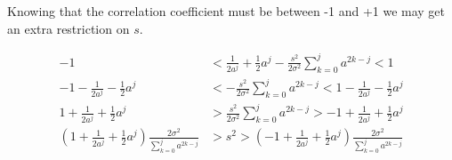 \begin{itemize}
    Knowing that the correlation coefficient must be between -1 and +1 we may get an extra restriction on $s$.

    \begin{align*}
        -1 &< \frac{1}{2a^j} + \frac{1}{2}a^j - \frac{s^2}{2\sigma^2}\sum_{k=0}^{j}a^{2k-j} < 1 \\
        -1 - \frac{1}{2a^j} - \frac{1}{2}a^j &<  - \frac{s^2}{2\sigma^2}\sum_{k=0}^{j}a^{2k-j} < 1 - \frac{1}{2a^j} - \frac{1}{2}a^j \\
        1 + \frac{1}{2a^j} + \frac{1}{2}a^j &>  \frac{s^2}{2\sigma^2}\sum_{k=0}^{j}a^{2k-j} > -1 + \frac{1}{2a^j} + \frac{1}{2}a^j \\
        \left(1 + \frac{1}{2a^j} + \frac{1}{2}a^j\right)\frac{2\sigma^2}{\sum_{k=0}^{j}a^{2k-j}} &>  s^2 > \left(-1 + \frac{1}{2a^j} + \frac{1}{2}a^j\right)\frac{2\sigma^2}{\sum_{k=0}^{j}a^{2k-j}} \\
    \end{align*}

\end{itemize}